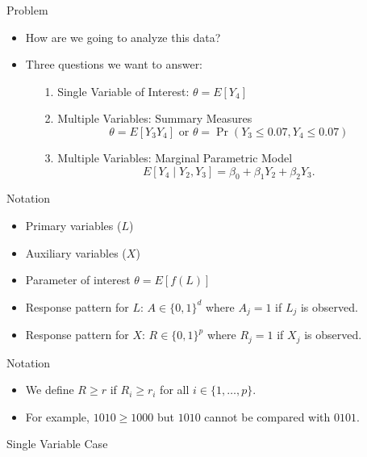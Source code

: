 \documentclass{beamer} %
\begin{document}
\begin{frame}{Problem}
  \begin{itemize}
    \item How are we going to analyze this data?
    \item Three questions we want to answer:
      \vspace{0.1cm}
      \begin{itemize}
        \item[1.] Single Variable of Interest: $\theta = E[Y_4]$
          \vspace{0.2cm}
        \item[2.] Multiple Variables: Summary Measures
          \[\theta = E[Y_3 Y_4] \text{ or } 
          \theta = \Pr(Y_3 \leq 0.07, Y_4 \leq 0.07)\]
        \item[3.] Multiple Variables: Marginal Parametric Model 
          \[E[Y_4 \mid Y_2, Y_3] = \beta_0 + \beta_1 Y_2 + \beta_2 Y_3.\]
      \end{itemize}
  \end{itemize}
\end{frame}

\begin{frame}{Notation}
  \begin{itemize}
    \item Primary variables ($L$)
    \item Auxiliary variables ($X$)
    \item Parameter of interest $\theta = E[f(L)]$
    \item Response pattern for $L$: $A \in \{0, 1\}^d$ where $A_j = 1$ if $L_j$ is
      observed.
    \item Response pattern for $X$: $R \in \{0, 1\}^p$ where $R_j = 1$ if $X_j$
      is observed.
  \end{itemize}
\end{frame}

\begin{frame}{Notation}
  \begin{itemize}
    \item We define $R \geq r$ if $R_i \geq r_i$ for all $i \in \{1, \dots,
      p\}$.
    \item For example, $1010 \geq 1000$ but $1010$ cannot be compared with
      $0101$.
  \end{itemize}
\end{frame}

\begin{frame}

  \begin{center}
    \Large
    Single Variable Case
  \end{center}

\end{frame}
\end{document}
